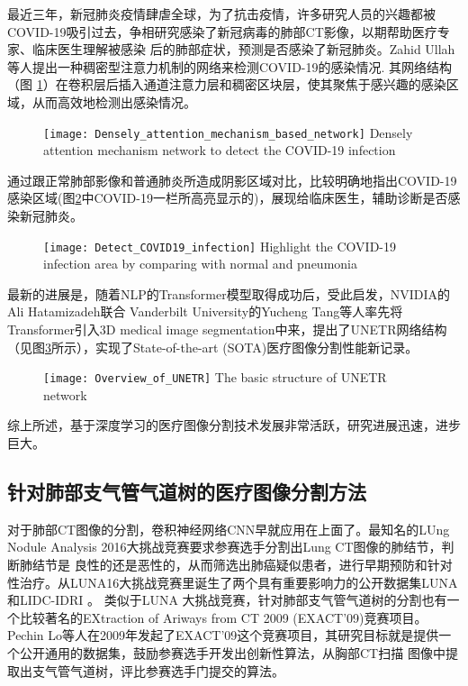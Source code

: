 	最近三年，新冠肺炎疫情肆虐全球，为了抗击疫情，许多研究人员的兴趣都被COVID-19吸引过去，争相研究感染了新冠病毒的肺部CT影像，以期帮助医疗专家、临床医生理解被感染
	后的肺部症状，预测是否感染了新冠肺炎。Zahid Ullah等人\cite{Ullah2023DenselyAM}提出一种稠密型注意力机制的网络来检测COVID-19的感染情况. 其网络结构（图
	\ref{fig:COVID19}）在卷积层后插入通道注意力层和稠密区块层，使其聚焦于感兴趣的感染区域，从而高效地检测出感染情况。
	\begin{figure}[htp]
		\centering
		\texttt{[image: Densely\_attention\_mechanism\_based\_network]}
			{Densely attention mechanism network to detect the COVID-19 infection}
		\label{fig:COVID19}
	\end{figure}
	通过跟正常肺部影像和普通肺炎所造成阴影区域对比，比较明确地指出COVID-19感染区域(图\ref{fig:COVID19_detection}中COVID-19一栏所高亮显示的)，展现给临床医生，辅助诊断是否感染新冠肺炎。
	\begin{figure}[ht]
		\centering
		\texttt{[image: Detect\_COVID19\_infection]}
			{Highlight the COVID-19 infection area by comparing with normal and pneumonia}
		\label{fig:COVID19_detection}
	\end{figure}
	
	最新的进展是，随着NLP的Transformer模型\cite{Devlin2019BERTPO, NIPS2017Attention}取得成功后，受此启发，NVIDIA的Ali Hatamizadeh联合
	Vanderbilt University的Yucheng Tang等人\cite{unetr}率先将Transformer引入3D medical image segmentation中来，提出了UNETR网络结构
	（见图\ref{fig:UNETR}所示），实现了State-of-the-art (SOTA)医疗图像分割性能新记录。
	\begin{figure}[hbp]
		\centering
		\texttt{[image: Overview\_of\_UNETR]}
			{The basic structure of UNETR network}
		\label{fig:UNETR}
	\end{figure}
	
	综上所述，基于深度学习的医疗图像分割技术发展非常活跃，研究进展迅速，进步巨大。
	
	
	
	\subsection{针对肺部支气管气道树的医疗图像分割方法}
	对于肺部CT图像的分割，卷积神经网络CNN早就应用在上面了。最知名的LUng Nodule Analysis 2016大挑战竞赛要求参赛选手分割出Lung CT图像的肺结节，判断肺结节是
	良性的还是恶性的，从而筛选出肺癌疑似患者，进行早期预防和针对性治疗。从LUNA16大挑战竞赛里诞生了两个具有重要影响力的公开数据集LUNA和LIDC-IDRI
	\cite{Charles2011LIDC}。 类似于LUNA	大挑战竞赛，针对肺部支气管气道树的分割也有一个比较著名的EXtraction of Ariways from CT 2009 (EXACT'09)竞赛项目。
	Pechin Lo等人\cite{Lo2012ExtractionOA}在2009年发起了EXACT'09这个竞赛项目，其研究目标就是提供一个公开通用的数据集，鼓励参赛选手开发出创新性算法，从胸部CT扫描
	图像中提取出支气管气道树，评比参赛选手门提交的算法。
	
